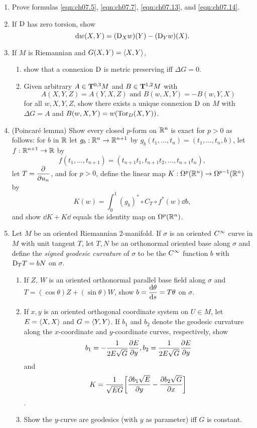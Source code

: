 \documentclass[../main]{subfiles}
\begin{document}
\begin{enumerate}
    \item\label{pro:68} Prove formulas \eqref{eqn:ch07.5}, \eqref{eqn:ch07.7}, \eqref{eqn:ch07.13}, and \eqref{eqn:ch07.14}.
    
    \item\label{pro:69} If $\connection$ has zero torsion, show \[\dd w(X, Y) = (\connection_X w)(Y) - (\connection_Y w)(X).\]
    
    \item\label{pro:70} 
    If $M$ is Riemannian and $G(X, Y) = \ip X Y$,
    \begin{enumerate}[label=(\roman*)]
        \item show that a connexion $\connection$ is metric preserving iff $\Delta G = 0$.
        \item Given arbitrary $A\in\tensorbundle{M}{0}{ 3}$ and $B\in\tensorbundle{M}{1}{ 2}$ with \[A(X, Y, Z) = A(Y, X, Z)\text{ and }B(w, X, Y) = -B(w, Y, X)\] for all $w, X, Y, Z$, show there exists a unique connexion $\connection$ on $M$ with $\Delta G = A$ and $B(w, X, Y) = w(\Tor_D(X, Y))$. 
    \end{enumerate}
   
    
    \item\label{pro:71} (Poincar\'e lemma) Show every closed $p$-form on $\bbR^{n}$ is exact for $p>0$ as follows: for $b$ in $\bbR$ let $g_{b}: \bbR^{n} \rightarrow \bbR^{n+1}$ by $g_{b}\left(t_{1}, \ldots, t_{n}\right)=\left(t_{1}, \ldots, t_{n}, b\right)$, let $f: \bbR^{n+1} \rightarrow \bbR$ by \[f\left(t_{1}, \ldots, t_{n+1}\right)=\left(t_{n+1} t_{1}, t_{n+1} t_{2}, \ldots, t_{n+1} t_{n}\right),\] let $T=\pdv{}{u_n}$, and for $p>0$, define the linear map $K: \formbundle{\bbR^{n}}{p} \rightarrow \formbundle{\bbR^{n}}{p-1}$ by \[K(w)=\int_{0}^{1}(g_{b})^\ast \circ C_{T} \circ f^\ast(w) \dd b,\] and show $\dd K+K \dd$ equals the identity map on $\formbundle{\bbR^{n}}{p}$.
    \item\label{pro:72} Let $M$ be an oriented Riemannian 2-manifold. If $\sigma$ is an oriented $\CInfty$ curve in $M$ with unit tangent $T$, let $T, N$ be an orthonormal oriented base along $\sigma$ and define the \emph{signed geodesic curvature} of $\sigma$ to be the $\CInfty$ function $b$ with $\connection_{T} T=b N$ on $\sigma$. 
    \begin{enumerate}[label = (\roman*)]
        \item If $Z$, $W$ is an oriented orthonormal parallel base field along $\sigma$ and $T=(\cos \theta) Z+(\sin \theta) W$, show $b = \dv{\theta}{s} = T \theta$ on $\sigma$.
        \item If $x, y$ is an oriented orthogonal coordinate system on $U\in M$, let $E=\ip X X$ and $G = \ip Y Y$. If $b_1$ and $b_{2}$ denote the geodesic curvature along the $x$-coordinate and $y$-coordinate curves, respectively, show \[b_{1}=-\dfrac{1}{2E\sqrt{G}}\pdv{E}{y}, b_{2}=\dfrac{1}{2E\sqrt{G}}\pdv{E}{y}\] and \[K=\dfrac{1}{\sqrt{EG}} \bigg[ \pdv{b_1\sqrt{E}}{y}-\pdv{b_2\sqrt{G}}{x}\bigg]\].
        \item  Show the $y$-curve are geodesics (with $y$ as parameter) iff $G$ is constant.
    \end{enumerate}
     

\end{enumerate}
\end{document}

